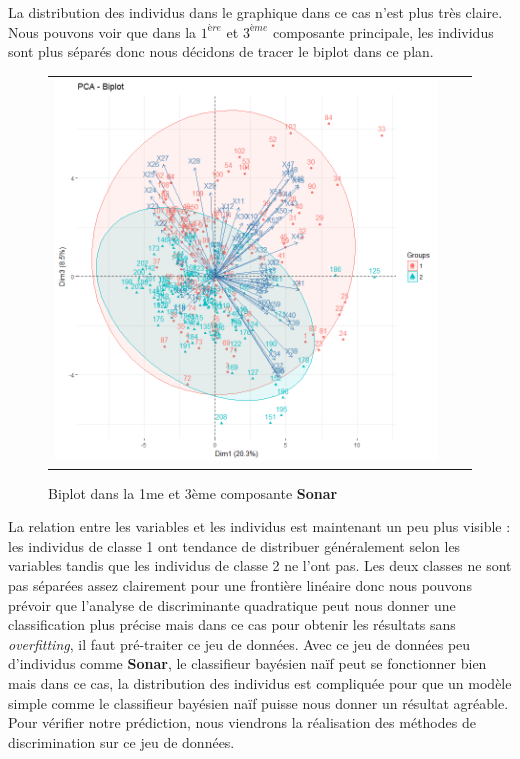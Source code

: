 \documentclass[a4paper,11pt,oneside,roman]{article}
\begin{document}
\newline
La distribution des individus dans le graphique dans ce cas n'est plus très claire. Nous pouvons voir que dans la $1^{ère}$ et $3^{ème}$ composante principale, les individus sont plus séparés donc nous décidons de tracer le biplot dans ce plan. \newline
\begin{figure}[htb]
    \centering
    \begin{tabular}{ccc}
    \includegraphics[scale = .3]{./discrimination/Sonar/biplot13.png}  
    \end{tabular}
    \caption{Biplot dans la 1me et 3ème composante \textbf{Sonar}}
    \label{fig:my_label}
\end{figure}
La relation entre les variables et les individus est maintenant un peu plus visible : les individus de classe 1 ont tendance de distribuer généralement selon les variables tandis que les individus de classe 2 ne l'ont pas. Les deux classes ne sont pas séparées assez clairement pour une frontière linéaire donc nous pouvons prévoir que l'analyse de discriminante quadratique peut nous donner une classification plus précise mais dans ce cas pour obtenir les résultats sans \textit{overfitting}, il faut pré-traiter ce jeu de données. Avec ce jeu de données peu d'individus comme \textbf{Sonar}, le classifieur bayésien naïf peut se fonctionner bien mais dans ce cas, la distribution des individus est compliquée pour que un modèle simple comme le classifieur bayésien naïf puisse nous donner un résultat agréable. Pour vérifier notre prédiction, nous viendrons la réalisation des méthodes de discrimination sur ce jeu de données.
\end{document}
